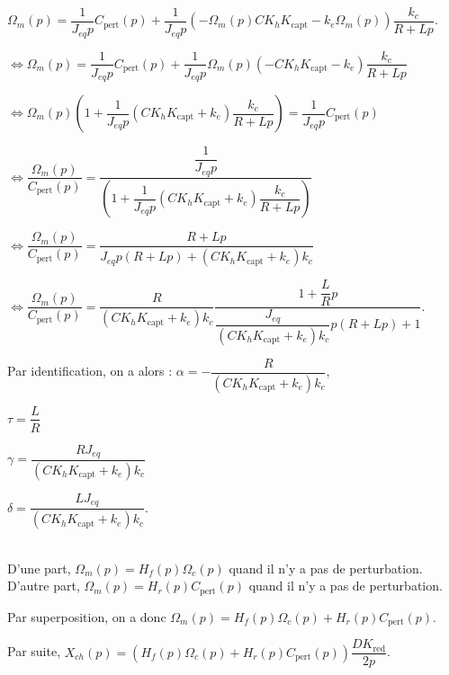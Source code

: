  $\Omega_m(p) = \dfrac{1}{J_{eq}p} C_{\text{pert}}(p) 
 + \dfrac{1}{J_{eq}p} \left(-\Omega_m(p) C K_h K_{\text{capt}}-k_e\Omega_m(p)\right) \dfrac{k_c}{R+Lp}$.

$\Leftrightarrow 
\Omega_m(p) = \dfrac{1}{J_{eq}p} C_{\text{pert}}(p) 
 + \dfrac{1}{J_{eq}p} \Omega_m(p) \left(- C K_h K_{\text{capt}}-k_e\right) \dfrac{k_c}{R+Lp}$
 
 $\Leftrightarrow 
\Omega_m(p)\left(1+\dfrac{1}{J_{eq}p} \left( C K_h K_{\text{capt}}+k_e\right) \dfrac{k_c}{R+Lp}\right)= \dfrac{1}{J_{eq}p} C_{\text{pert}}(p) 
 $

$\Leftrightarrow 
\dfrac{\Omega_m(p)}{C_{\text{pert}}(p)}
 = \dfrac{\dfrac{1}{J_{eq}p}}{\left(1+\dfrac{1}{J_{eq}p} \left( C K_h K_{\text{capt}}+k_e\right) \dfrac{k_c}{R+Lp}\right)}
 $


$\Leftrightarrow 
\dfrac{\Omega_m(p)}{C_{\text{pert}}(p)}
 = \dfrac{R+Lp}{J_{eq}p\left(R+Lp\right)+ \left( C K_h K_{\text{capt}}+k_e\right) k_c}
 $

$\Leftrightarrow 
\dfrac{\Omega_m(p)}{C_{\text{pert}}(p)}
 = \dfrac{R}{\left( C K_h K_{\text{capt}}+k_e\right) k_c} \dfrac{1+\dfrac{L}{R}p}{\dfrac{J_{eq}}{\left( C K_h K_{\text{capt}}+k_e\right) k_c}p\left(R+Lp\right)+ 1}
 $.
 
 Par identification, on a alors : 
 $\alpha = - \dfrac{R}{\left( C K_h K_{\text{capt}}+k_e\right) k_c}$, 

 $\tau = \dfrac{L}{R}$

$\gamma = \dfrac{R J_{eq}}{\left( C K_h K_{\text{capt}}+k_e\right) k_c} $

$\delta = \dfrac{LJ_{eq}}{\left( C K_h K_{\text{capt}}+k_e\right) k_c}$.

\else
\fi

\ifprof ~\\
D'une part, $\Omega_m(p) = H_f(p) \Omega_c(p)$ quand il n'y a pas de perturbation.
D'autre part, $\Omega_m(p) = H_r(p) C_{\text{pert}}(p)$ quand il n'y a pas de perturbation.

Par superposition, on a donc $\Omega_m(p) = H_f(p) \Omega_c(p) + H_r(p) C_{\text{pert}}(p)$.

Par suite, $X_{ch}(p)=\left(H_f(p) \Omega_c(p) + H_r(p) C_{\text{pert}}(p)\right) \dfrac{DK_{\text{red}}}{2p}$.
\else
\fi



